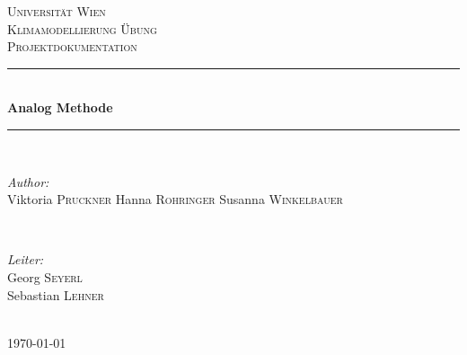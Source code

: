 \documentclass[12pt]{article}
\begin{document}
\begin{titlepage}

\newcommand{\HRule}{\rule{\linewidth}{0.5mm}}

\centering

\textsc{\LARGE Universität Wien}\\[1.5cm] 
\textsc{\Large Klimamodellierung Übung}\\[0.5cm] 
\textsc{\large Projektdokumentation}\\[0.5cm] 

\HRule \\[0.4cm]
{ \huge \bfseries Analog Methode}\\[0.4cm] 
\HRule \\[1.5cm]

\begin{minipage}{0.4\textwidth}
\begin{flushleft} \large
\emph{Author:}\\
Viktoria \textsc{Pruckner}
Hanna \textsc{Rohringer}
Susanna \textsc{Winkelbauer}
\end{flushleft}
\end{minipage}
~
\begin{minipage}{0.4\textwidth}
\begin{flushright} \large
\emph{Leiter:} \\
Georg \textsc{Seyerl}\\
Sebastian \textsc{Lehner}
\end{flushright}
\end{minipage}\\[4cm]

{\large \today}\\[3cm]
\vfill
\end{titlepage}

\tableofcontents 

\newpage
\end{document}
